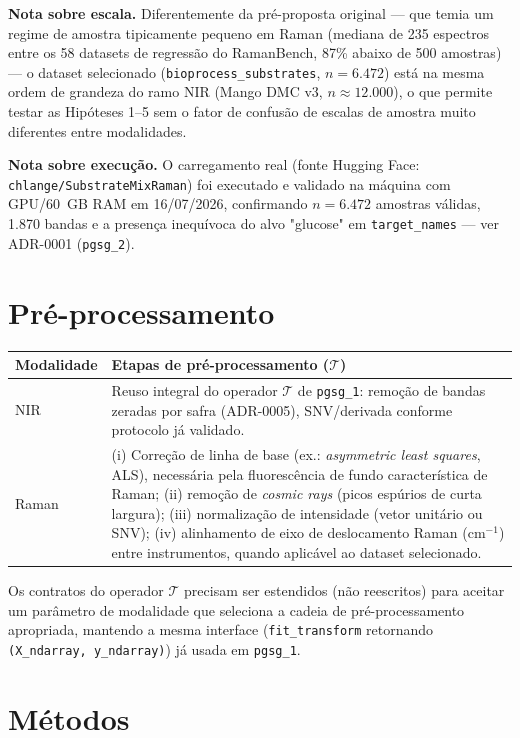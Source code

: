 \documentclass[11pt,a4paper]{article}
\begin{document}
\noindent\textbf{Nota sobre escala.} Diferentemente da pré-proposta original --- que temia um regime de amostra tipicamente pequeno em Raman (mediana de 235 espectros entre os 58 datasets de regressão do RamanBench, 87\% abaixo de 500 amostras) --- o dataset selecionado (\texttt{bioprocess\_substrates}, $n=6{.}472$) está na mesma ordem de grandeza do ramo NIR (Mango DMC v3, $n\approx 12{.}000$), o que permite testar as Hipóteses 1--5 sem o fator de confusão de escalas de amostra muito diferentes entre modalidades.

\noindent\textbf{Nota sobre execução.} O carregamento real (fonte Hugging Face: \texttt{chlange/SubstrateMixRaman}) foi executado e validado na máquina com GPU/60~GB RAM em 16/07/2026, confirmando $n=6.472$ amostras válidas, 1.870 bandas e a presença inequívoca do alvo "glucose" em \texttt{target\_names} --- ver ADR-0001 (\texttt{pgsg\_2}).

\section{Pré-processamento}

\begin{center}
\begin{tabular}{p{2.6cm}p{11.5cm}}
\toprule
Modalidade & Etapas de pré-processamento ($\mathcal{T}$) \\
\midrule
NIR & Reuso integral do operador $\mathcal{T}$ de \texttt{pgsg\_1}: remoção de bandas zeradas por safra (ADR-0005), SNV/derivada conforme protocolo já validado. \\
Raman & (i) Correção de linha de base (ex.: \emph{asymmetric least squares}, ALS), necessária pela fluorescência de fundo característica de Raman; (ii) remoção de \emph{cosmic rays} (picos espúrios de curta largura); (iii) normalização de intensidade (vetor unitário ou SNV); (iv) alinhamento de eixo de deslocamento Raman (cm$^{-1}$) entre instrumentos, quando aplicável ao dataset selecionado. \\
\bottomrule
\end{tabular}
\end{center}

Os contratos do operador $\mathcal{T}$ precisam ser estendidos (não reescritos) para aceitar um parâmetro de modalidade que seleciona a cadeia de pré-processamento apropriada, mantendo a mesma interface (\texttt{fit\_transform} retornando \texttt{(X\_ndarray, y\_ndarray)}) já usada em \texttt{pgsg\_1}.

\section{Métodos}
\end{document}
